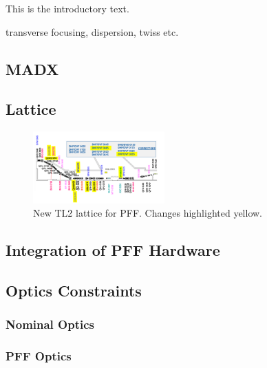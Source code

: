 
This is the introductory text.


transverse focusing, dispersion, twiss etc.

\subsection{MADX}
\label{ss:madx}


\subsection{Lattice}
\label{ss:tl2Lattice}

\begin{figure}
  \centering
  \includegraphics[width=0.45\textwidth]{Figures/newTL2Lattice}
  \caption{New TL2 lattice for PFF. Changes highlighted yellow.}
  \label{f:newTL2Lattice}
\end{figure}

\subsection{Integration of PFF Hardware}
\label{ss:tl2PFFIntegration}

\subsection{Optics Constraints}
\label{ss:tl2OpticsReqs}

\subsubsection{Nominal Optics}
\label{sss:nominalOpticsReqs}

\subsubsection{PFF Optics}
\label{sss:pffOpticsReqs}

